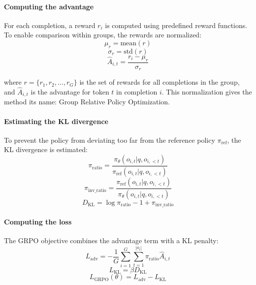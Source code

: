 \paragraph{Computing the advantage} For each completion, a reward $r_i$ is computed using predefined reward functions. To enable comparison within groups, the rewards are normalized:
\begin{equation}
\mu_r = \text{mean}(r)
\end{equation}
\begin{equation}
\sigma_r = \text{std}(r)
\end{equation}
\begin{equation}
\hat{A}_{i,t} = \frac{r_i - \mu_r}{\sigma_r}
\end{equation}

where $r = \{r_1, r_2, \ldots, r_G\}$ is the set of rewards for all completions in the group, and $\hat{A}_{i,t}$ is the advantage for token $t$ in completion $i$. This normalization gives the method its name: Group Relative Policy Optimization.

\paragraph{Estimating the KL divergence} To prevent the policy from deviating too far from the reference policy $\pi_{\text{ref}}$, the KL divergence is estimated:
\begin{equation}
\pi_\text{ratio} = \frac{\pi_\theta(o_{i,t} | q, o_{i,<t})}{\pi_{\text{ref}}(o_{i,t} | q, o_{i,<t})}
\end{equation}
\begin{equation}
\pi_\text{inv\_ratio} = \frac{\pi_{\text{ref}}(o_{i,t} | q, o_{i,<t})}{\pi_\theta(o_{i,t} | q, o_{i,<t})}
\end{equation}
\begin{equation}
D_{\text{KL}} = \log\pi_\text{ratio} - 1 + \pi_\text{inv\_ratio}
\end{equation}

\paragraph{Computing the loss} The GRPO objective combines the advantage term with a KL penalty:
\begin{equation}
L_{\text{adv}} = -\frac{1}{G}\sum_{i=1}^{G}\sum_{t=1}^{|o_i|}\pi_\text{ratio}\hat{A}_{i,t}
\end{equation}
\begin{equation}
L_{\text{KL}} = \beta D_{\text{KL}}
\end{equation}
\begin{equation}
L_{\text{GRPO}}(\theta) = L_{\text{adv}} - L_{\text{KL}}
\end{equation}

